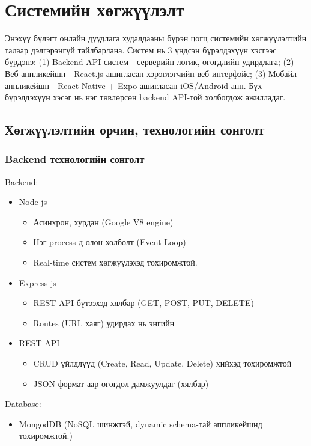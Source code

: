 \chapter{Системийн хөгжүүлэлт}
\label{Chapter3}

Энэхүү бүлэгт онлайн дуудлага худалдааны бүрэн цогц системийн хөгжүүлэлтийн талаар дэлгэрэнгүй тайлбарлана. Систем нь 3 үндсэн бүрэлдэхүүн хэсгээс бүрдэнэ: (1) Backend API систем - серверийн логик, өгөгдлийн удирдлага; (2) Веб аппликейшн - React.js ашигласан хэрэглэгчийн веб интерфэйс; (3) Мобайл аппликейшн - React Native + Expo ашигласан iOS/Android апп. Бүх бүрэлдэхүүн хэсэг нь нэг төвлөрсөн backend API-той холбогдож ажилладаг.

\section{Хөгжүүлэлтийн орчин, технологийн сонголт}

\subsection{Backend технологийн сонголт}
Backend:
\begin{itemize}
    \item Node js 
    \begin{itemize}
   \item Асинхрон, хурдан (Google V8 engine)
   \item Нэг process-д олон холболт (Event Loop)
   \item Real-time систем хөгжүүлэхэд тохиромжтой.
\end{itemize}
    \item Express js
    \begin{itemize}
   \item REST API бүтээхэд хялбар (GET, POST, PUT, DELETE)
   \item Routes (URL хаяг) удирдах нь энгийн
\end{itemize}
    \item REST API
    \begin{itemize}
   \item CRUD үйлдлүүд (Create, Read, Update, Delete) хийхэд тохиромжтой
   \item JSON формат-аар өгөгдөл дамжуулдаг (хялбар)
\end{itemize}
\end{itemize}
Database:
\begin{itemize}
    \item MongodDB  (NoSQL шинжтэй, dynamic schema-тай аппликейшнд тохиромжтой.)
\end{itemize}

